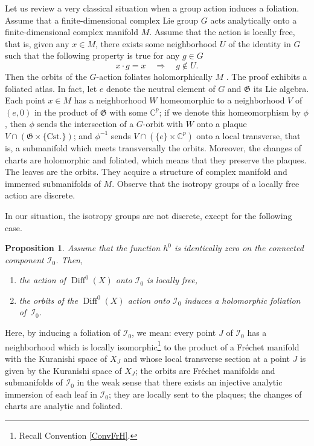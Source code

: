 \documentclass[JEP,XML,SOM,Unicode]{cedram}
\let\mathcal\mathscr
\DeclareMathOperator{\Diff}{Diff}
\theoremstyle{plain}
\newtheorem{proposition}[theorem]{Proposition}
\theoremstyle{definition}
\theoremstyle{remark}
\numberwithin{equation}{section}
\newcommand{\CC}{{\mathbb{C}}}
\newcommand{\cI}{\mathcal{I}}
\begin{document}
Let us review a very classical situation when a group action induces a foliation. Assume that a finite-dimensional complex Lie group $G$ acts analytically onto a finite-dimensional complex manifold $M$. Assume that the action is locally free, that is, given any $x\in M$, there exists some neighborhood $U$ of the identity in $G$ such that the following property is true for any $g\in G$\vspace*{-2pt}
\begin{equation*}
x\cdot g=x\quad\Longrightarrow \quad g\not\in U.
\end{equation*}
Then the orbits of the $G$-action foliates holomorphically $M$ \cite[\S 2.1]{CLN}. The proof exhibits a foliated atlas. In fact, let $e$ denote the neutral element of $G$ and $\mathfrak G$ its Lie algebra. Each point $x\in M$ has a neighborhood $W$ homeomorphic to a neighborhood $V$ of $(e,0)$ in the product of $\mathfrak G$ with some $\CC^p$; if we denote this homeomorphism by $\phi$, then $\phi$ sends the intersection of a $G$-orbit with $W$ onto a plaque $V\cap (\mathfrak G\times\{\text{Cst.}\})$; and $\phi^{-1}$ sends $V\cap (\{e\}\times\CC^p)$ onto a local transverse, that is, a submanifold which meets transversally the orbits. Moreover, the changes of charts are holomorphic and foliated, which means that they preserve the plaques. The leaves are the orbits. They acquire a structure of complex manifold and immersed submanifolds of $M$. Observe that the isotropy groups of a locally free action are discrete.

In our situation, the isotropy groups are not discrete, except for the following case.

\begin{proposition}
\label{foliationsimple}
Assume that the function $h^0$ is identically zero on the connected component $\cI_0$. Then,
\begin{enumerate}
\item\label{foliationsimple1}
the action of $\Diff^0(X)$ onto $\cI_0$ is locally free,
\item\label{foliationsimple2}
the orbits of the $\Diff^0(X)$ action onto $\cI_0$ induces a holomorphic foliation of~$\cI_0$.
\end{enumerate}
\end{proposition}

Here, by inducing a foliation of $\cI_0$, we mean: every point $J$ of $\cI_0$ has a neighborhood which is locally isomorphic\footnote{Recall Convention \ref{ConvFrH}.} to the product of a Fréchet manifold with the Kuranishi space of $X_J$ and whose local transverse section at a point $J$ is given by the Kuranishi space of $X_J$; the orbits are Fréchet manifolds and submanifolds of $\cI_0$ in the weak sense that there exists an injective analytic immersion of each leaf in $\cI_0$; they are locally sent to the plaques; the changes of charts are analytic and foliated.
\end{document}
